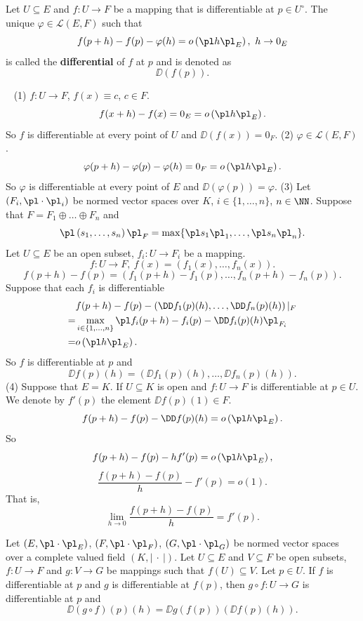 \begin{definitionenv}
    Let $U\subseteq E$ and $f:U\longrightarrow F$ be a mapping that is differentiable at $p\in U^\circ$. The unique $\varphi\in \mathscr{L}(E,F)$ such that
    $$f(p+h)-f(p)-\varphi(h)=o\left(\pl h\pl_E\right),\ h\rightarrow 0_E$$
    is called the \textbf{differential} of $f$ at $p$ and is denoted as
    $$\DD(f(p)).$$
\end{definitionenv}
\begin{exampleenv}
    \ \newline
    (1) $f:U\longrightarrow F$, $f(x)\equiv c$, $c\in F$. 
    $$f(x+h)-f(x)=0_E=o\left(\pl h\pl_E\right).$$
    So $f$ is differentiable at every point of $U$ and $\DD(f(x))=0_F$.
    \newline
    (2) $\varphi\in \mathscr{L}(E,F)$. 
    $$\varphi(p+h)-\varphi(p)-\varphi(h)=0_F=o\left(\pl h\pl_E\right).$$
    So $\varphi$ is differentiable at every point of $E$ and $\DD(\varphi(p))=\varphi$.
    \newline
    (3) Let $\left(F_i,\pl\cdot\pl_i\right)$ be normed vector spaces over $K$, $i\in\{1,\ldots,n\}$, $n\in\NN$. Suppose that $F=F_1\oplus\dots\oplus F_n$ and 
    $$\pl\left(s_1,\dots,s_n\right)\pl_F=\max\{\pl s_1\pl_1, \ldots,\pl s_n\pl_n\}.$$
    Let $U\subseteq E$ be an open subset, $f_i:U\longrightarrow F_i$ be a mapping. 
    $$f:U\longrightarrow F,\ f(x)=\left(f_1(x),\ldots,f_n(x)\right).$$
    $$f(p+h)-f(p)=\left(f_1(p+h)-f_1(p),\ldots,f_n(p+h)-f_n(p)\right).$$
    Suppose that each $f_i$ is differentiable
    \begin{align*}
        &f(p+h)-f(p)-\left(\DD f_1(p)(h),\ldots,\DD f_n(p)(h)\right)|_F\\
    =&\max_{i\in\{1,\ldots,n\}}\pl f_i(p+h)-f_i(p)-\DD f_i(p)(h)\pl_{F_i}\\
    =&o\left(\pl h\pl_E\right).
    \end{align*}
    So $f$ is differentiable at $p$ and
    $$\DD f(p)(h)=\left(\DD f_1(p)(h),\ldots,\DD f_n(p)(h)\right).$$
    (4) Suppose that $E=K$. If $U\subseteq K$ is open and $f:U\longrightarrow F$ is differentiable at $p\in U$. We denote by $f'(p)$ the element $\DD f(p)(1)\in F$.
    $$f(p+h)-f(p)-\DD f(p)(h)=o\left(\pl h\pl_E\right).$$ 
    So
    $$f(p+h)-f(p)-hf'(p)=o\left(\pl h\pl_E\right),$$
    $$\frac{f(p+h)-f(p)}{h}-f'(p)=o(1).$$
    That is,
    $$\lim_{h\rightarrow 0}\frac{f(p+h)-f(p)}{h}=f'(p).$$
\end{exampleenv}
\begin{theoremenv}
    Let $(E,\pl\cdot\pl_E)$, $(F,\pl\cdot\pl_F)$, $(G,\pl\cdot\pl_G)$ be normed vector spaces over a complete valued field $(K,\left|\ \cdot\ \right|)$. Let $U\subseteq E$ and $V\subseteq F$ be open subsets, $f:U\longrightarrow F$ and $g:V\longrightarrow G$ be mappings such that $f(U)\subseteq V$. Let $p\in U$. If $f$ is differentiable at $p$ and $g$ is differentiable at $f(p)$, then $g\circ f:U\longrightarrow G$ is differentiable at $p$ and
    $$\DD(g\circ f)(p)(h)=\DD g(f(p))\left( \DD f(p)(h)\right).$$
\end{theoremenv}
